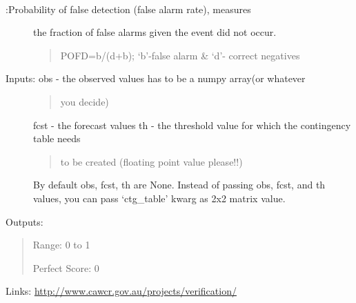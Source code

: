 \documentclass[letterpaper,10pt,english]{sphinxmanual}
\begin{document}

\begin{fulllineitems}
\label{diagnosis:ctgfunction.pofd}~\begin{description}
\item[{:Probability of false detection (false alarm rate), measures}] \leavevmode
the fraction of false alarms given the event did not occur.
\begin{quote}

POFD=b/(d+b); `b'-false alarm \& `d'- correct negatives
\end{quote}

\item[{Inputs: obs - the observed values has to be a numpy array(or whatever}] \leavevmode\begin{quote}

you decide)
\end{quote}

fcst - the forecast values
th  - the threshold value for which the contingency table needs
\begin{quote}

to be created (floating point value please!!)
\end{quote}

By default obs, fcst, th are None. Instead of passing obs, fcst,
and th values, you can pass `ctg\_table' kwarg as 2x2 matrix value.

\end{description}

Outputs:
\begin{quote}

Range: 0 to 1

Perfect Score: 0
\end{quote}

Links: \href{http://www.cawcr.gov.au/projects/verification/}{http://www.cawcr.gov.au/projects/verification/}

\end{fulllineitems}

\end{document}
